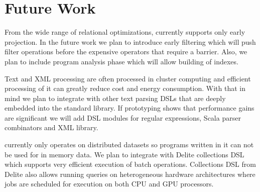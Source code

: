 \section{Future Work}
\label{sec:future-work}

From the wide range of relational optimizations, \tool currently supports only early projection. In the future work we plan to introduce early filtering which will push filter operations   before the expensive operators that require a barrier. Also, we plan to include program analysis phase which will allow building of indexes. 

Text and XML processing are often processed in cluster computing and efficient processing of it can greatly reduce cost and energy consumption. With that in mind we plan to integrate \tool with other text parsing DSLs that are deeply embedded into the standard library. If prototyping shows that performance gains are significant we will add DSL modules for regular expressions, Scala parser combinators and XML library. 

\tool currently only operates on distributed datasets so programs written in it can not be used for in memory data. We plan to integrate \tool with Delite  collections DSL which supports very efficient execution of batch operations. Collections DSL from Delite also allows running queries on heterogeneous hardware architectures where jobs are scheduled for execution on both CPU and GPU processors. 
